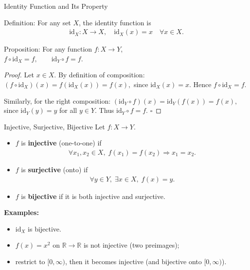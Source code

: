 \begin{frame}{Identity Function and Its Property}
\vspace{-0.4cm}
\begin{block}{Definition:} For any set \(X\), the identity function is
\begin{align*}
\mathrm{id}_X: X \to X, \quad \mathrm{id}_X(x) = x \quad \forall x \in X.
\end{align*}
\end{block}

\vspace{-0.5cm}
\begin{block}{Proposition:}
For any function \( f: X \to Y \),\\ $f \circ \mathrm{id}_X = f, \qquad \mathrm{id}_Y \circ f = f.$
\end{block}
\vspace{-0.4cm}
\begin{proof}
Let \(x \in X\).
By definition of composition: $
(f \circ \mathrm{id}_X)(x) = f(\mathrm{id}_X(x)) = f(x),$  since \(\mathrm{id}_X(x) = x\).
Hence \(f \circ \mathrm{id}_X = f.\)

Similarly, for the right composition: $(\mathrm{id}_Y \circ f)(x) = \mathrm{id}_Y(f(x)) = f(x),$ since \(\mathrm{id}_Y(y) = y\) for all \(y \in Y\).
Thus \(\mathrm{id}_Y \circ f = f.\) \(\square\)
\end{proof}
\end{frame}

\begin{frame}{Injective, Surjective, Bijective}
Let \(f: X \to Y\).

\begin{itemize}
  \item \(f\) is \textbf{injective} (one-to-one) if
  \begin{align*}
    \forall x_1, x_2 \in X,\; f(x_1) = f(x_2) \Rightarrow x_1 = x_2.
  \end{align*}
  \item \(f\) is \textbf{surjective} (onto) if
  \begin{align*}
    \forall y \in Y,\; \exists x \in X,\; f(x) = y.
  \end{align*}
  \item \(f\) is \textbf{bijective} if it is both injective and surjective.
\end{itemize}

\textbf{Examples:}
\begin{itemize}
    \item \(\mathrm{id}_X\) is bijective.
    \item \(f(x) = x^2\) on \(\mathbb{R} \to \mathbb{R}\) is not injective (two preimages);
    \item restrict to \([0,\infty)\), then it becomes injective (and bijective onto \([0,\infty)\)).
\end{itemize}
\end{frame}

